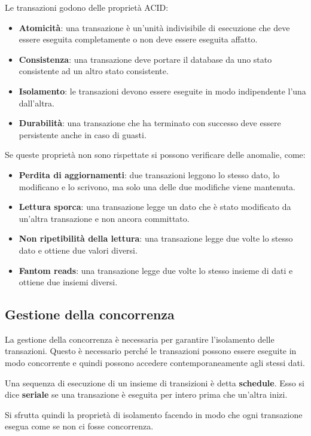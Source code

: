 Le transazioni godono delle proprietà ACID:
\begin{itemize}
    \item \textbf{Atomicità}: una transazione è un'unità indivisibile di
          esecuzione che deve essere eseguita completamente o non deve essere
          eseguita affatto.
    \item \textbf{Consistenza}: una transazione deve portare il database da uno
          stato consistente ad un altro stato consistente.
    \item \textbf{Isolamento}: le transazioni devono essere eseguite in modo
          indipendente l'una dall'altra.
    \item \textbf{Durabilità}: una transazione che ha terminato con successo
          deve essere persistente anche in caso di guasti.
\end{itemize}
Se queste proprietà non sono rispettate si possono verificare delle anomalie,
come:
\begin{itemize}
    \item \textbf{Perdita di aggiornamenti}: due transazioni leggono lo stesso
          dato, lo modificano e lo scrivono, ma solo una delle due modifiche
          viene mantenuta.
    \item \textbf{Lettura sporca}: una transazione legge un dato che è stato
          modificato da un'altra transazione e non ancora committato.
    \item \textbf{Non ripetibilità della lettura}: una transazione legge due
          volte lo stesso dato e ottiene due valori diversi.
    \item \textbf{Fantom reads}: una transazione legge due volte lo stesso
          insieme di dati e ottiene due insiemi diversi.
\end{itemize}
\subsection{Gestione della concorrenza}
La gestione della concorrenza è necessaria per garantire l'isolamento delle
transazioni. Questo è necessario perché le transazioni possono essere eseguite
in modo concorrente e quindi possono accedere contemporaneamente agli stessi
dati.
\begin{definizione}
    Una sequenza di esecuzione di un insieme di transizioni è detta \textbf{schedule}.
    Esso si dice \textbf{seriale} se una transazione è eseguita per intero prima
    che un'altra inizi.
\end{definizione}
Si sfrutta quindi la proprietà di isolamento facendo in modo che ogni
transazione esegua come se non ci fosse concorrenza.

